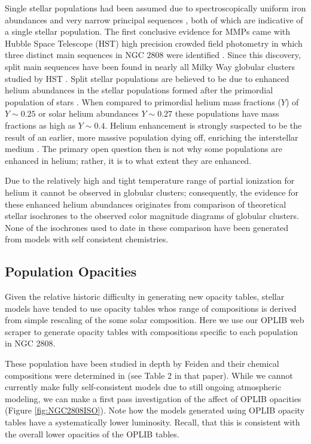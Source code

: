 Single stellar populations had been assumed due to spectroscopically uniform
iron abundances \citep{Gratton2012} and very narrow principal sequences
\citep{Stetson1988}, both of which are indicative of a single stellar
population.  The first conclusive evidence for MMPs came with Hubble Space
Telescope (HST) high precision crowded field photometry in which three distinct
main sequences in NGC 2808 were identified \citep{Piotto2007}. Since this
discovery, split main sequences have been found in nearly all Milky Way
globular clusters studied by HST \citep{anderson2009,milone2011}. Split stellar
populations are believed to be due to enhanced helium abundances in the stellar
populations formed after the primordial population of stars
\citep{d2005,Piotto2007}. When compared to primordial helium mass fractions
($Y$) of $Y\sim 0.25$ \citep{collaboration2016planck} or solar helium
abundances $Y\sim0.27$ \citep{vinyoles2017new} these populations have mass
fractions as high as $Y\sim 0.4$. Helium enhancement is strongly suspected to
be the result of an earlier, more massive population dying off, enriching the
interstellar medium \citep{Gratton2001, Gratton2004, Gratton2012}. The primary open question then is not why some populations
are enhanced in helium; rather, it is to what extent they are enhanced. 

Due to the relatively high and tight temperature range of partial ionization
for helium it cannot be observed in globular clusters; consequently, the
evidence for these enhanced helium abundances originates from comparison of
theoretical stellar isochrones to the observed color magnitude diagrams of
globular clusters. None of the isochrones used to date in these comparison have
been generated from models with self consistent chemistries. 

\subsection{Population Opacities}
Given the relative historic difficulty in generating new opacity tables,
stellar models have tended to use opacity tables whos range of compositions is
derived from simple rescaling of the some solar composition. Here we use our
OPLIB web scraper to generate opacity tables with compositions specific to each
population in NGC 2808.

These population have been studied in depth by Feiden and their chemical
compositions were determined in \citet{Milone2015} (see Table 2 in that paper).
While we cannot currently make fully self-consistent models due to still
ongoing atmospheric modeling, we can make a first pass investigation of the
affect of OPLIB opacities (Figure \ref{fig:NGC2808ISO}). Note how the models
generated using OPLIB opacity tables have a systematically lower luminosity.
Recall, that this is consistent with the overall lower opacities of the OPLIB
tables.

